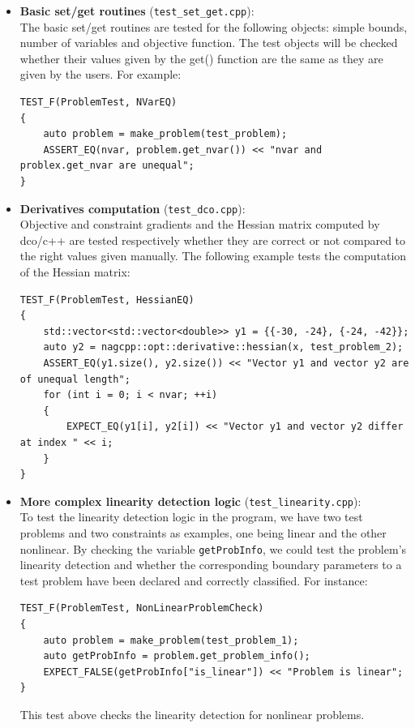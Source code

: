 \documentclass{book}
\begin{document}
\begin{itemize}
\item \textbf{Basic set/get routines} (\texttt{test\_set\_get.cpp}):\\
The basic set/get routines are tested for the following objects: simple bounds, number of variables and objective function. The test objects will be checked whether their values given by the get() function are the same as they are given by the users. For example: 
\begin{lstlisting}[basicstyle=\normalsize]
TEST_F(ProblemTest, NVarEQ)
{
	auto problem = make_problem(test_problem);
	ASSERT_EQ(nvar, problem.get_nvar()) << "nvar and problex.get_nvar are unequal";
}
\end{lstlisting}
\item \textbf{Derivatives computation} (\texttt{test\_dco.cpp}):\\
Objective and constraint gradients and the Hessian matrix computed by dco/c++ are tested respectively whether they are correct or not compared to the right values given manually. The following example tests the computation of the Hessian matrix: 
\begin{lstlisting}[basicstyle=\normalsize]
TEST_F(ProblemTest, HessianEQ)
{
	std::vector<std::vector<double>> y1 = {{-30, -24}, {-24, -42}};
	auto y2 = nagcpp::opt::derivative::hessian(x, test_problem_2);
	ASSERT_EQ(y1.size(), y2.size()) << "Vector y1 and vector y2 are of unequal length";
	for (int i = 0; i < nvar; ++i)
	{
		EXPECT_EQ(y1[i], y2[i]) << "Vector y1 and vector y2 differ at index " << i;
	}
}
\end{lstlisting}
\item \textbf{More complex linearity detection logic} (\texttt{test\_linearity.cpp}):\\
To test the linearity detection logic in the program, we have two test problems and two constraints as examples, one being linear and the other nonlinear. By checking the variable \texttt{getProbInfo}, we could test the problem's linearity detection and whether the corresponding boundary parameters to a test problem have been declared and correctly classified. For instance: 
\begin{lstlisting}[basicstyle=\normalsize]
TEST_F(ProblemTest, NonLinearProblemCheck)
{
	auto problem = make_problem(test_problem_1);
	auto getProbInfo = problem.get_problem_info();
	EXPECT_FALSE(getProbInfo["is_linear"]) << "Problem is linear";
}
\end{lstlisting}
This test above checks the linearity detection for nonlinear problems.
\end{itemize}
\end{document}
